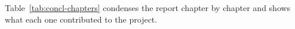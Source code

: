 \documentclass{FastFyp}
\begin{document}


Table~\ref{tab:concl-chapters} condenses the report chapter by chapter and shows what each one contributed to the project.
\end{document}
